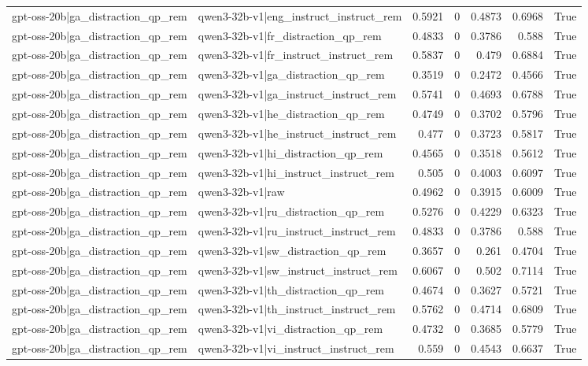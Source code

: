 \begin{table}
\begin{tabular}{l l r r r r l}
gpt-oss-20b|ga_distraction_qp_rem & qwen3-32b-v1|eng_instruct_instruct_rem & 0.5921 & 0 & 0.4873 & 0.6968 & True \\
gpt-oss-20b|ga_distraction_qp_rem & qwen3-32b-v1|fr_distraction_qp_rem & 0.4833 & 0 & 0.3786 & 0.588 & True \\
gpt-oss-20b|ga_distraction_qp_rem & qwen3-32b-v1|fr_instruct_instruct_rem & 0.5837 & 0 & 0.479 & 0.6884 & True \\
gpt-oss-20b|ga_distraction_qp_rem & qwen3-32b-v1|ga_distraction_qp_rem & 0.3519 & 0 & 0.2472 & 0.4566 & True \\
gpt-oss-20b|ga_distraction_qp_rem & qwen3-32b-v1|ga_instruct_instruct_rem & 0.5741 & 0 & 0.4693 & 0.6788 & True \\
gpt-oss-20b|ga_distraction_qp_rem & qwen3-32b-v1|he_distraction_qp_rem & 0.4749 & 0 & 0.3702 & 0.5796 & True \\
gpt-oss-20b|ga_distraction_qp_rem & qwen3-32b-v1|he_instruct_instruct_rem & 0.477 & 0 & 0.3723 & 0.5817 & True \\
gpt-oss-20b|ga_distraction_qp_rem & qwen3-32b-v1|hi_distraction_qp_rem & 0.4565 & 0 & 0.3518 & 0.5612 & True \\
gpt-oss-20b|ga_distraction_qp_rem & qwen3-32b-v1|hi_instruct_instruct_rem & 0.505 & 0 & 0.4003 & 0.6097 & True \\
gpt-oss-20b|ga_distraction_qp_rem & qwen3-32b-v1|raw & 0.4962 & 0 & 0.3915 & 0.6009 & True \\
gpt-oss-20b|ga_distraction_qp_rem & qwen3-32b-v1|ru_distraction_qp_rem & 0.5276 & 0 & 0.4229 & 0.6323 & True \\
gpt-oss-20b|ga_distraction_qp_rem & qwen3-32b-v1|ru_instruct_instruct_rem & 0.4833 & 0 & 0.3786 & 0.588 & True \\
gpt-oss-20b|ga_distraction_qp_rem & qwen3-32b-v1|sw_distraction_qp_rem & 0.3657 & 0 & 0.261 & 0.4704 & True \\
gpt-oss-20b|ga_distraction_qp_rem & qwen3-32b-v1|sw_instruct_instruct_rem & 0.6067 & 0 & 0.502 & 0.7114 & True \\
gpt-oss-20b|ga_distraction_qp_rem & qwen3-32b-v1|th_distraction_qp_rem & 0.4674 & 0 & 0.3627 & 0.5721 & True \\
gpt-oss-20b|ga_distraction_qp_rem & qwen3-32b-v1|th_instruct_instruct_rem & 0.5762 & 0 & 0.4714 & 0.6809 & True \\
gpt-oss-20b|ga_distraction_qp_rem & qwen3-32b-v1|vi_distraction_qp_rem & 0.4732 & 0 & 0.3685 & 0.5779 & True \\
gpt-oss-20b|ga_distraction_qp_rem & qwen3-32b-v1|vi_instruct_instruct_rem & 0.559 & 0 & 0.4543 & 0.6637 & True \\

\end{tabular}
\end{table}
